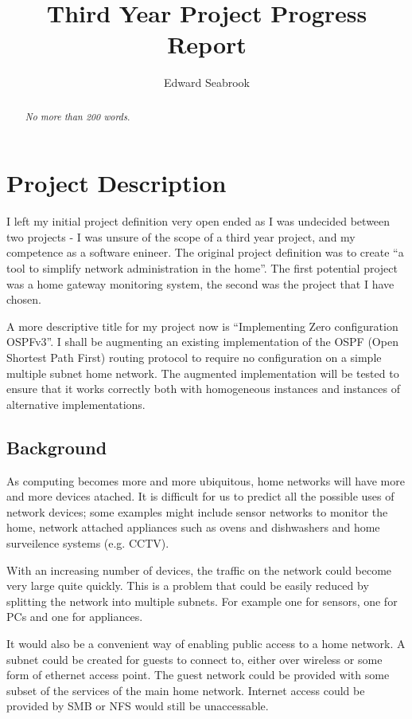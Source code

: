 \documentclass[12pt]{report}
\author{Edward Seabrook}
\title{Third Year Project Progress Report}
\begin{document}



\begin{abstract}
\em No more than 200 words. \em


\end{abstract}

\tableofcontents
\clearpage
\listoftodos

\chapter{Project Description}
I left my initial project definition very open ended as I was undecided between
two projects - I was unsure of the scope of a third year project, and my
competence as a software enineer. The original project definition was to create
``a tool to simplify network administration in the home''. The first potential
project was a home gateway monitoring system, the second was the project that
I have chosen. 

A more descriptive title for my project now is ``Implementing Zero configuration
OSPFv3''. I shall be augmenting an existing implementation of the OSPF (Open
Shortest Path First) routing protocol to require no configuration on a simple
multiple subnet home network. The augmented implementation will be tested to
ensure that it works correctly both with homogeneous instances and instances of
alternative implementations. 

\section{Background}
As computing becomes more and more ubiquitous, home networks will have more and
more devices atached. It is difficult for us to predict all the possible uses of
network devices; some examples might include sensor networks to monitor the
home, network attached appliances such as ovens and dishwashers and home
surveilence systems (e.g. CCTV). 

With an increasing number of devices, the traffic on the network could become
very large quite quickly. This is a problem that could be easily reduced by
splitting the network into multiple subnets. For example one for sensors, one
for PCs and one for appliances. 

It would also be a convenient way of enabling public access to a home
network. A subnet could be created for guests to connect to, either over
wireless or some form of ethernet access point. The guest network could be
provided with some subset of the services of the main home network. Internet
access could be provided by SMB or NFS would still be unaccessable.
\end{document}
